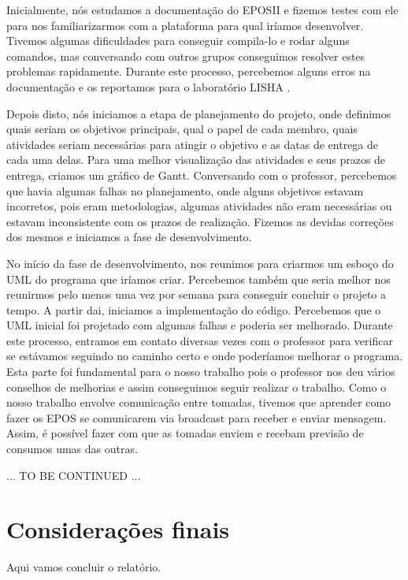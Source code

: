 \documentclass[article,11pt,oneside,a4paper,english,brazil]{abntex2}
\begin{document}
	Inicialmente, nós estudamos a documentação do EPOSII \cite{eposproject} e fizemos testes com ele para nos familiarizarmos com a plataforma para qual iríamos desenvolver. Tivemos algumas dificuldades para conseguir compila-lo e rodar alguns comandos, mas conversando com outros grupos conseguimos resolver estes problemas rapidamente. Durante este processo, percebemos alguns erros na documentação e os reportamos para o laboratório LISHA \cite{lishahomepage}.
	
	Depois disto, nós iniciamos a etapa de planejamento do projeto, onde definimos quais seriam os objetivos principais, qual o papel de cada membro, quais atividades seriam necessárias para atingir o objetivo e as datas de entrega de cada uma delas. Para uma melhor visualização das atividades e seus prazos de entrega, criamos um gráfico de Gantt. Conversando com o professor, percebemos que havia algumas falhas no planejamento, onde alguns objetivos estavam incorretos, pois eram metodologias, algumas atividades não eram necessárias ou estavam inconsistente com os prazos de realização. Fizemos as devidas correções dos mesmos e iniciamos a fase de desenvolvimento.
	
	No início da fase de desenvolvimento, nos reunimos para criarmos um esboço do UML do programa que iríamos criar. Percebemos também que seria melhor nos reunirmos pelo menos uma vez por semana para conseguir concluir o projeto a tempo. A partir dai, iniciamos a implementação do código. Percebemos que o UML inicial foi projetado com algumas falhas e poderia ser melhorado. Durante este processo, entramos em contato diversas vezes com o professor para verificar se estávamos seguindo no caminho certo e onde poderíamos melhorar o programa. Esta parte foi fundamental para o nosso trabalho pois o professor nos deu vários conselhos de melhorias e assim conseguimos seguir realizar o trabalho. Como o nosso trabalho envolve comunicação entre tomadas, tivemos que aprender como fazer os EPOS se comunicarem via broadcast para receber e enviar mensagem. Assim, é possível fazer com que as tomadas enviem e recebam previsão de consumos umas das outras. 
	
	... TO BE CONTINUED ...
	
\section{Considerações finais}
	Aqui vamos concluir o relatório.
\postextual
\end{document}
